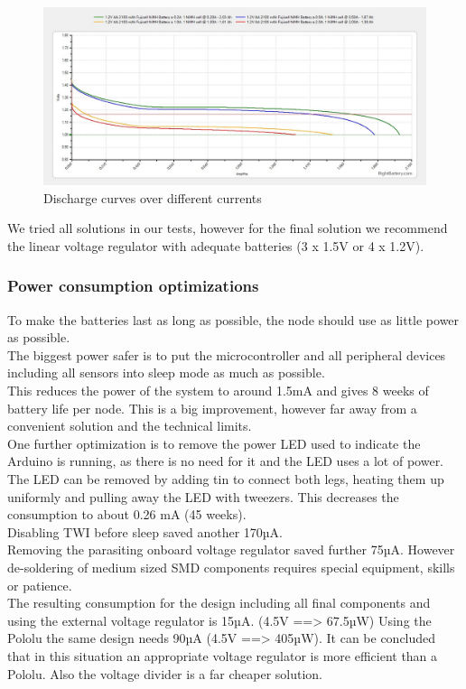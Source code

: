 \begin{figure}[htbp]
\begin{center}
\includegraphics[width=1.0\columnwidth]{images/discharge_curves.jpg}
\end{center}
\caption{Discharge curves over different currents}
\label{fig:dischage_curve}
\end{figure}


We tried all solutions in our tests, however for the final solution we recommend the linear voltage regulator with adequate batteries (3 x 1.5V or 4 x 1.2V).

\subsubsection{Power consumption optimizations}
To make the batteries last as long as possible, the node should use as little power as possible.\\
The biggest power safer is to put the microcontroller and all peripheral devices including all sensors into sleep mode as much as possible.\\
This reduces the power of the system to around 1.5mA and gives 8 weeks of battery life per node. This is a big improvement, however far away from a convenient solution and the technical limits.\\
One further optimization is to remove the power LED used to indicate the Arduino is running, as there is no need for it and the LED uses a lot of power. The LED can be removed by adding tin to connect both legs, heating them up uniformly and pulling away the LED with tweezers. This decreases the consumption to about 0.26 mA (45 weeks). \\
Disabling TWI before sleep saved another 170µA.\\
Removing the parasiting onboard voltage regulator saved further 75µA. However de-soldering of medium sized SMD components requires special equipment, skills or patience.\\
The resulting consumption for the design including all final components and using the external voltage regulator is 15µA. (4.5V ==> 67.5µW)
Using the Pololu the same design needs 90µA (4.5V ==> 405µW).
It can be concluded that in this situation an appropriate voltage regulator is more efficient than a Pololu. Also the voltage divider is a far cheaper solution.\\

